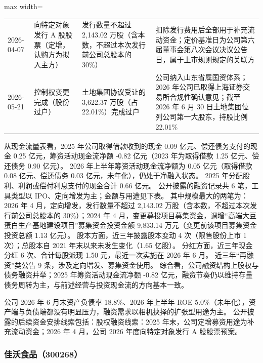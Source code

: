 \begin{center}
\begin{adjustbox}{max width=\textwidth}
\begin{tabular}{@{}p{1.45cm}p{2.55cm}p{4.05cm}p{4.95cm}@{}}
2026-04-07 & 向特定对象发行 A 股股票（定增，认购方为拟入主方） & 发行数量不超过 2,\allowbreak{}143.02 万股（含本数，\allowbreak{}不超过本次发行前公司总股本的 30\%） & 扣除发行费用后全部用于补充流动资金；定价基准日为公司第六届董事会第八次会议决议公告日，\allowbreak{}属于上市规则规定的关联方 \\
2026-05-21 & 控制权变更完成（股份过户） & 土地集团协议受让的 3,\allowbreak{}622.37 万股（占 22.01\%）完成过户 & 公司纳入山东省属国资体系；2026 年公司已取得上海证券交易所合规性确认意见；截至 2026 年 6 月 30 日土地集团位列公司第一大股东，\allowbreak{}持股比例 22.01\% \\
\bottomrule
\end{tabular}
\end{adjustbox}
\end{center}

 从现金流量表看，2025 年公司取得借款收到的现金 0.09 亿元、偿还债务支付的现金 0.25 亿元，筹资活动现金流净额 -0.82 亿元（2023 年为取得借款 1.25 亿元、偿还债务 0.90 亿元）。 2026 年上半年筹资活动现金流净额为 0.05 亿元（取得借款 0.08 亿元、偿还债务 0.03 亿元，未年化），仍处于净融入状态。 2025 年分配股利、利润或偿付利息支付的现金合计 0.66 亿元。 公开披露的融资记录共 6 笔，工具类型以 IPO、定向增发为主；金额与用途见下表。 其中规模最大的两笔为：2026 年 4 月，定向增发，发行数量不超过 2,143.02 万股（含本数，不超过本次发行前公司总股本的 30\%）；2024 年 4 月，变更募投项目募集资金，调增“高端大豆蛋白生产基地建设项目”募集资金投资金额 9,833.14 万元（变更前该项目募集资金投资总额 1.13 亿元）。 股本方面，近三年披露股本变动 4 次（限售股份上市 1 次）；总股本自 2021 年末以来未发生变化（1.65 亿股）。 分红方面，近三年现金分红 6 次、合计每股派现 1.50 元，最近一次实施在 2026 年 6 月。 近三年“再融资”类公告 9 条，涉及定向增发、募集资金使用。 综合看，公司融资结构上股权与债务融资并举；2025 年筹资活动现金流净额 -0.82 亿元，融资节奏仍以维持存量债务周转为主，与前述经营与投资现金流的方向基本一致。

 公司 2026 年 6 月末资产负债率 18.8\%、2026 年上半年 ROE 5.0\%（未年化），资产端与负债端都没有明显压力，融资需求以相机抉择的扩张型用途为主。 公开披露的后续资金安排线索包括：股权融资线索：2025 年末，公司定增募资用途为补充流动资金；2026 年 4 月，公司 2026 年度向特定对象发行 A 股股票预案。




\subsubsection{佳沃食品（300268）}
\label{co:300268}

